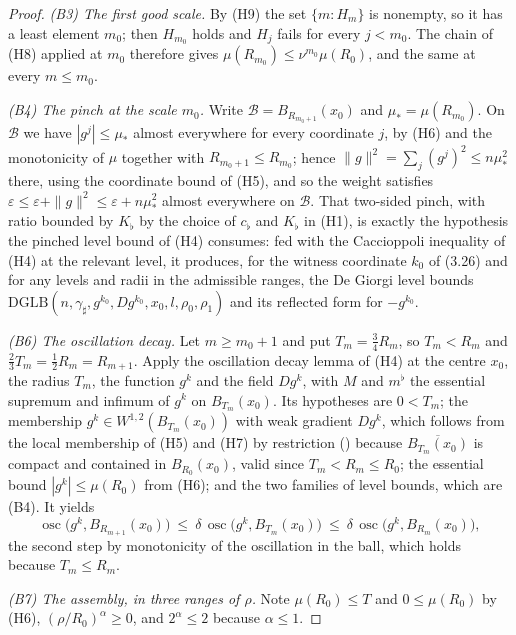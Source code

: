\begin{proof}
\emph{(B3) The first good scale.}  By (H9) the set $\{m:H_m\}$ is nonempty, so
it has a least element $m_0$; then $H_{m_0}$ holds and $H_j$ fails for every
$j<m_0$.  The chain of (H8) applied at $m_0$ therefore gives
$\mu(R_{m_0})\le\nu^{m_0}\mu(R_0)$, and the same at every $m\le m_0$.

\emph{(B4) The pinch at the scale $m_0$.}  Write $\mathcal B=B_{R_{m_0+1}}(x_0)$
and $\mu_\ast=\mu(R_{m_0})$.  On $\mathcal B$ we have $|g^j|\le\mu_\ast$ almost
everywhere for every coordinate $j$, by (H6) and the monotonicity of $\mu$
together with $R_{m_0+1}\le R_{m_0}$; hence
$\|g\|^2=\sum_j(g^j)^2\le n\mu_\ast^2$ there, using the coordinate bound of
(H5), and so the weight satisfies
$\varepsilon\le\varepsilon+\|g\|^2\le\varepsilon+n\mu_\ast^2$ almost everywhere
on $\mathcal B$.  That two-sided pinch, with ratio bounded by $K_\flat$ by the
choice of $c_\flat$ and $K_\flat$ in (H1), is exactly the hypothesis the
pinched level bound of (H4) consumes: fed with the Caccioppoli inequality of
(H4) at the relevant level, it produces, for the witness coordinate $k_0$ of
(3.26) and for any levels and radii in the admissible ranges, the De Giorgi
level bounds $\mathrm{DGLB}(n,\gamma_\sharp,g^{k_0},Dg^{k_0},x_0,l,\rho_0,\rho_1)$
and its reflected form for $-g^{k_0}$.

\emph{(B6) The oscillation decay.}  Let $m\ge m_0+1$ and put
$T_m=\tfrac34R_m$, so $T_m<R_m$ and $\tfrac23T_m=\tfrac12R_m=R_{m+1}$.  Apply
the oscillation decay lemma of (H4) at the centre $x_0$, the radius $T_m$, the
function $g^{k}$ and the field $Dg^{k}$, with $M$ and $m^\flat$ the essential
supremum and infimum of $g^k$ on $B_{T_m}(x_0)$.  Its hypotheses are $0<T_m$;
the membership $g^k\in W^{1,2}(B_{T_m}(x_0))$ with weak gradient $Dg^k$, which
follows from the local membership of (H5) and (H7) by restriction
() because $\overline{B_{T_m}(x_0)}$ is compact
and contained in $B_{R_0}(x_0)$, valid since $T_m<R_m\le R_0$; the essential
bound $|g^k|\le\mu(R_0)$ from (H6); and the two families of level bounds, which
are (B4).  It yields
\[
\operatorname*{osc}\bigl(g^k,B_{R_{m+1}}(x_0)\bigr)
\ \le\ \delta\,\operatorname*{osc}\bigl(g^k,B_{T_m}(x_0)\bigr)
\ \le\ \delta\,\operatorname*{osc}\bigl(g^k,B_{R_m}(x_0)\bigr),
\tag{3.27}
\]
the second step by monotonicity of the oscillation in the ball, which holds
because $T_m\le R_m$.

\emph{(B7) The assembly, in three ranges of $\rho$.}  Note
$\mu(R_0)\le T$ and $0\le\mu(R_0)$ by (H6), $(\rho/R_0)^{\alpha}\ge0$, and
$2^{\alpha}\le2$ because $\alpha\le1$.


\end{proof}
